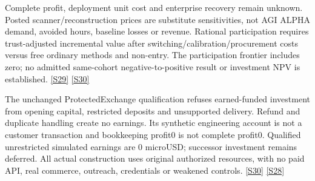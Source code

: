 \documentclass[11pt,letterpaper]{article}
\begin{document}
Complete profit, deployment unit cost and enterprise recovery remain unknown. Posted scanner/reconstruction prices are substitute sensitivities, not AGI ALPHA demand, avoided hours, baseline losses or revenue. Rational participation requires trust-adjusted incremental value after switching/calibration/procurement costs versus free ordinary methods and non-entry. The participation frontier includes zero; no admitted same-cohort negative-to-positive result or investment NPV is established. \href{https://github.com/MontrealAI/AGI-Alpha-Invention-Flywheel-Lab/blob/2b7a58e6e6593ae48da6f7f33865db94868c957f/campaign/overnight-008/economics/recovery/run002/CUMULATIVE_COST_RESOURCE.json}{[S29]} \href{https://github.com/MontrealAI/AGI-Alpha-Invention-Flywheel-Lab/blob/2b7a58e6e6593ae48da6f7f33865db94868c957f/campaign/overnight-008/economics/recovery/run002/NO_EARNED_FUNDS.json}{[S30]}\par
The unchanged ProtectedExchange qualification refuses earned-funded investment from opening capital, restricted deposits and unsupported delivery. Refund and duplicate handling create no earnings. Its synthetic engineering account is not a customer transaction and bookkeeping profit0 is not complete profit0. Qualified unrestricted simulated earnings are 0 microUSD; successor investment remains deferred. All actual construction uses original authorized resources, with no paid API, real commerce, outreach, credentials or weakened controls. \href{https://github.com/MontrealAI/AGI-Alpha-Invention-Flywheel-Lab/blob/2b7a58e6e6593ae48da6f7f33865db94868c957f/campaign/overnight-008/economics/recovery/run002/NO_EARNED_FUNDS.json}{[S30]} \href{https://github.com/MontrealAI/AGI-Alpha-Invention-Flywheel-Lab/blob/2b7a58e6e6593ae48da6f7f33865db94868c957f/campaign/overnight-008/economics/recovery/run008/CUMULATIVE_COST_RESOURCE.json}{[S28]}\par
\end{document}
